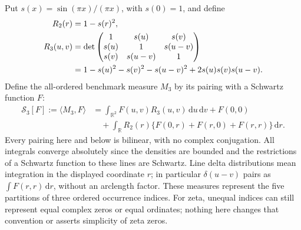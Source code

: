 \documentclass[11pt]{article}
\newcommand{\dd}{\,\mathrm d}
\begin{document}
Put \(s(x)=\sin(\pi x)/(\pi x)\), with \(s(0)=1\), and define
\begin{align}
 R_2(r)&=1-s(r)^2,\notag\\
 R_3(u,v)&=\det\begin{pmatrix}
 1&s(u)&s(v)\\ s(u)&1&s(u-v)\\s(v)&s(u-v)&1
 \end{pmatrix}\notag\\
 &=1-s(u)^2-s(v)^2-s(u-v)^2+2s(u)s(v)s(u-v).
 \label{eq:triple-sine-determinant}
\end{align}
Define the all-ordered benchmark measure \(M_3\) by its pairing with a
Schwartz function \(F\):
\begin{equation}\label{eq:triple-sine-functional}
 \begin{split}
 \mathcal S_3[F]:=\langle M_3,F\rangle
 &=\int_{\mathbb R^2}F(u,v)R_3(u,v)\dd u\dd v+F(0,0)\\
 &\quad+\int_{\mathbb R}R_2(r)
       \{F(0,r)+F(r,0)+F(r,r)\}\dd r.
 \end{split}
\end{equation}
Every pairing here and below is bilinear, with no complex conjugation.
All integrals converge absolutely since the densities are bounded and
the restrictions of a Schwartz function to these lines are Schwartz.
Line delta distributions mean integration in the displayed coordinate
\(r\); in particular \(\delta(u-v)\) pairs as \(\int F(r,r)\dd r\),
without an arclength factor. These measures represent the five partitions
of three ordered occurrence indices. For zeta, unequal indices can still
represent equal complex zeros or equal ordinates; nothing here changes
that convention or asserts simplicity of zeta zeros.
\end{document}
